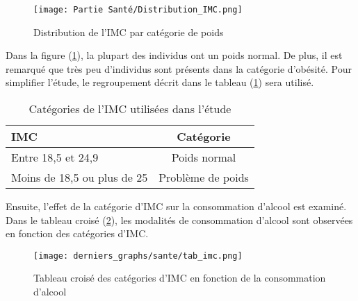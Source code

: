 \documentclass{article}
\begin{document}
\begin{figure}[H]
  \centering
  \texttt{[image: Partie Santé/Distribution\_IMC.png]} 
  \caption{Distribution de l'IMC par catégorie de poids}
  \label{fig:santefig1}
\end{figure}
Dans la figure (\ref{fig:santefig1}), la plupart des individus ont un poids normal. De plus, il est remarqué que très peu d'individus sont présents dans la catégorie d'obésité. Pour simplifier l'étude, le regroupement décrit dans le tableau (\ref{monimc}) sera utilisé.


\begin{table}[H]
    \centering
    \begin{tabular}{lc}
        \toprule
        \textbf{IMC} & \textbf{Catégorie} \\
        \midrule
        Entre 18,5 et 24,9 & Poids normal \\
        Moins de 18,5 ou plus de 25 & Problème de poids \\
        \bottomrule
    \end{tabular}
    \caption{Catégories de l'IMC utilisées dans l'étude}
    \label{monimc}

\end{table}

Ensuite, l'effet de la catégorie d'IMC sur la consommation d'alcool est examiné. Dans le tableau croisé (\ref{fig:santefig2}), les modalités de consommation d'alcool sont observées en fonction des catégories d'IMC.

\vspace{0.5cm}
\begin{figure}[H]
  \centering
  \texttt{[image: derniers\_graphs/sante/tab\_imc.png]} 
  \caption{Tableau croisé des catégories d'IMC en fonction de la consommation d'alcool}
  \label{fig:santefig2}
\end{figure}
\end{document}

